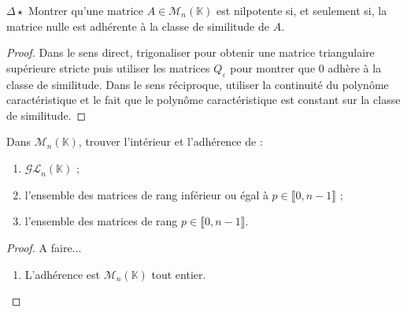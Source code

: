 \documentclass[french,a4paper]{article}
\newcommand{\K}{\mathbb{K}}
\theoremstyle{plain}
\theoremstyle{definition}
\theoremstyle{remark}
\begin{document}
\begin{ex}{$\Delta\star$}
	Montrer qu'une matrice $A\in\mathcal{M}_n(\K)$ est nilpotente si, et seulement si, la matrice nulle est adhérente à la classe de similitude de $A$.
\end{ex}
\begin{proof}
	Dans le sens direct, trigonaliser pour obtenir une matrice triangulaire supérieure stricte puis utiliser les matrices $Q_\varepsilon$ pour montrer que $0$ adhère à la classe de similitude. Dans le sens réciproque, utiliser la continuité du polynôme caractéristique et le fait que le polynôme caractéristique est constant sur la classe de similitude.
\end{proof}

\begin{ex}{}
	Dans $\mathcal{M}_n(\K)$, trouver l'intérieur et l'adhérence de :
	\begin{enumerate}
		\item $\mathcal{GL}_n(\K)$ ;
		\item l'ensemble des matrices de rang inférieur ou égal à $p\in\llbracket0,n-1\rrbracket$ ;
		\item l'ensemble des matrices de rang $p\in\llbracket0,n-1\rrbracket$.
	\end{enumerate}
\end{ex}
\begin{proof}
	A faire...
	\begin{enumerate}
		\item L'adhérence est $\mathcal{M}_n(\K)$ tout entier.
	\end{enumerate}
\end{proof}
\end{document}
